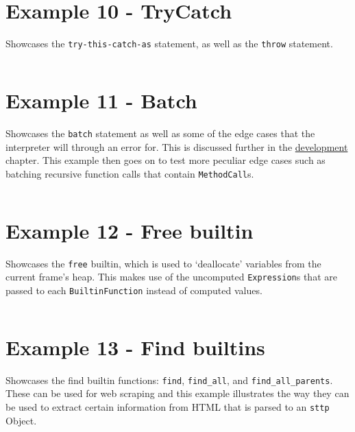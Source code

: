 \documentclass[]{full}
\theoremstyle{definition}
\begin{document}
\section{Example 10 - TryCatch}
\label{appendix:sttp-examples-10}

Showcases the \verb|try-this-catch-as| statement, as well as the \verb|throw| statement.

\inputminted[autogobble, breaklines, tabsize=4]{text}{../../src/_examples/example_10/example_10.sttp}

\section{Example 11 - Batch}
\label{appendix:sttp-examples-11}

Showcases the \verb|batch| statement as well as some of the edge cases that the interpreter will through an error for. This is discussed further in the \hyperref[chap:eval-ast-nodes-batch-edge-cases]{development} chapter. This example then goes on to test more peculiar edge cases such as batching recursive function calls that contain \verb|MethodCall|s.

\inputminted[autogobble, breaklines, tabsize=4]{text}{../../src/_examples/example_11/example_11.sttp}

\section{Example 12 - Free builtin}
\label{appendix:sttp-examples-12}

Showcases the \verb|free| builtin, which is used to `deallocate' variables from the current frame's heap. This makes use of the uncomputed \verb|Expression|s that are passed to each \verb|BuiltinFunction| instead of computed values.

\inputminted[autogobble, breaklines, tabsize=4]{text}{../../src/_examples/example_12/example_12.sttp}

\section{Example 13 - Find builtins}
\label{appendix:sttp-examples-13}

Showcases the find builtin functions: \verb|find|, \verb|find_all|, and \verb|find_all_parents|. These can be used for web scraping and this example illustrates the way they can be used to extract certain information from HTML that is parsed to an \verb|sttp| Object.
\end{document}
